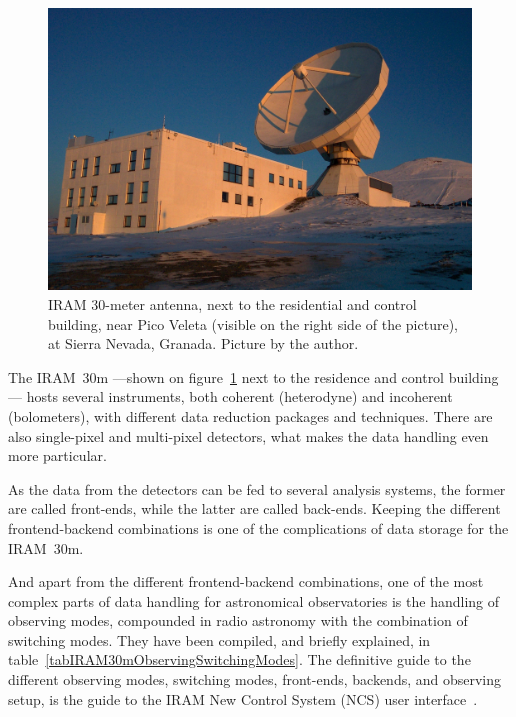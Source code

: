 		\begin{figure}[tbp]
			\begin{center}
				\includegraphics[width=\textwidth]
				{fig/IRAM_30m.jpg}
				\caption[IRAM 30-meter antenna.]
				{
					IRAM 30-meter antenna, next to the residential
					and control building, near Pico
					Veleta (visible on the right side of the
					picture), at Sierra Nevada, Granada. Picture by
					the author.
				}
		\label{fig:iram30m}
			\end{center}
		\end{figure}
		
		
		The IRAM~30m ---shown on figure~\ref{fig:iram30m} next
		to the residence and control building--- hosts several
		instruments, both coherent (heterodyne) and incoherent
		(bolometers), with different data reduction packages and
		techniques. There are also single-pixel and multi-pixel
		detectors, what makes the data handling even more
		particular.
		
		As the data from the detectors can be fed to several
		analysis systems, the former are called front-ends, while
		the latter are called back-ends. Keeping the different
		frontend-backend combinations is one of the complications
		of data storage for the IRAM~30m.
		
		And apart from the different frontend-backend combinations,
		one of the most complex parts of data handling for
		astronomical observatories is the handling of observing
		modes, compounded in radio astronomy with the combination
		of switching modes. They have been compiled, and briefly
		explained, in table~\ref{tabIRAM30mObservingSwitchingModes}.
		The definitive guide to the different observing modes,
		switching modes, front-ends, backends, and observing setup,
		is the guide to the IRAM New Control System (NCS) user
		interface\urlnote{\irampakourl}~\cite{2007pako.iram..109U}.
		
